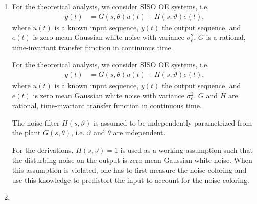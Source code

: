 \documentclass{responseletter}
\begin{document}
\begin{enumerate}

\item
{}
\begin{oldquote}
For the theoretical analysis, we consider \gls{SISO} \gls{OE} systems, i.e.
\begin{align}
y(t) &=G(s,\theta)u(t)  + H(s,\vartheta)e(t),
\end{align}
where $u(t)$ is a known input sequence, $y(t)$ the output sequence, and $e(t)$ is zero mean Gaussian white noise with variance $\sigma_{e}^2$.
$G$ is a rational, time-invariant transfer function in continuous time.
\end{oldquote}
\begin{newquote}
For the theoretical analysis, we consider \gls{SISO} \gls{OE} systems, i.e.
\begin{align}
y(t) &=G(s,\theta)u(t)  + H(s,\vartheta)e(t),
\end{align}
where $u(t)$ is a known input sequence, $y(t)$ the output sequence, and $e(t)$ is zero mean Gaussian white noise with variance $\sigma_{e}^2$.
$G$ and $H$ are rational, time-invariant transfer function in continuous time.
\omission{}
\begin{assumption}{2.1}
The noise filter $H(s,\vartheta)$ is assumed to be independently parametrized from the plant $G(s,\theta)$, i.e. $\vartheta$ and $\theta$ are independent.
\end{assumption}
\begin{assumption}{2.2}
For the derivations, $H(s,\vartheta) = 1$ is used as a working assumption such that the disturbing noise on the output is zero mean Gaussian white noise.
When this assumption is violated, one has to first measure the noise coloring and use this knowledge to predistort the input to account for the noise coloring.
\end{assumption}
\end{newquote}

\item {}


\end{enumerate}
\end{document}
